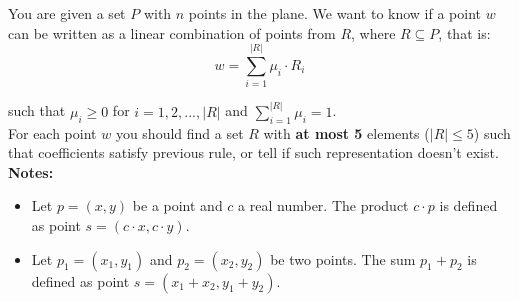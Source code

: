 %


You are given a set $P$ with $n$ points in the plane. We want to know if a point $w$ can be written as a linear combination of points from $R$, where $R \subseteq P$, that is:\\

$$w = \sum_{i=1}^{|R|} {\mu}_i \cdot R_i$$

such that ${\mu}_i \ge 0$ for $i = 1,2,...,|R|$ and $\displaystyle\sum_{i=1}^{|R|} {\mu}_i = 1$. \\

For each point $w$ you should find a set $R$ with \textbf{at most 5} elements ($|R| \le 5$) such that coefficients satisfy previous rule, or tell if such representation doesn't exist.\\

\textbf{Notes:}
\begin{itemize}
	\item Let $p = (x, y)$ be a point and $c$ a real number. The product $c \cdot p$ is defined as point $s = (c \cdot x, c \cdot y)$.
	\item Let $p_1 = (x_1, y_1)$ and $p_2 = (x_2, y_2)$ be two points. The sum $p_1 + p_2$ is defined as point $s = (x_1 + x_2, y_1 + y_2)$.
\end{itemize}




